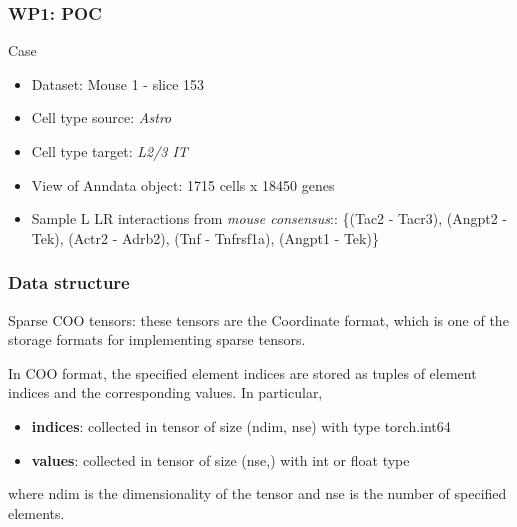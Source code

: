 \begin{frame}
    \frametitle{WP1: POC}
    \begin{block}{Case}
        \begin{itemize}
            \item Dataset: Mouse 1 - slice 153
            \item Cell type source: \textit{Astro}
            \item Cell type target: \textit{L2/3 IT}
            \item View of Anndata object: 1715 cells x 18450 genes
            \item Sample L LR interactions from \textit{mouse consensus}:: \{(Tac2 - Tacr3), (Angpt2 - Tek), (Actr2 - Adrb2), (Tnf - Tnfrsf1a), (Angpt1 - Tek)\}
            

        \end{itemize}
    \end{block}
\end{frame}

\begin{frame}
    \frametitle{Data structure}
    Sparse COO tensors: these tensors are the Coordinate format, which is one of the
    storage formats for implementing sparse tensors. 

    In COO format, the specified element indices are stored as tuples of element
    indices and the corresponding values. In particular,
    \begin{itemize}
        \item \textbf{indices}: collected in tensor of size (ndim, nse) with type torch.int64
        \item \textbf{values}: collected in tensor of size (nse,) with int or float type
    \end{itemize}
    
    where ndim is the dimensionality of the tensor and nse is the number of specified elements.
\end{frame}

